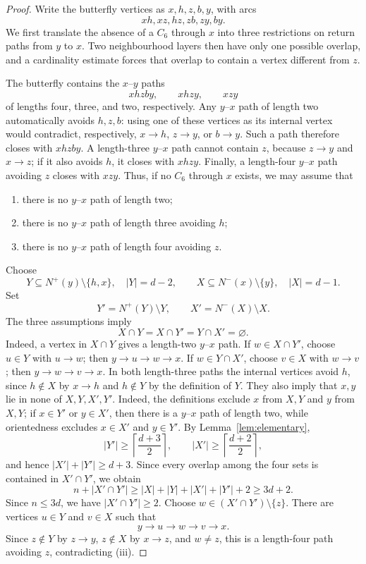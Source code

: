\documentclass[11pt]{amsart}
\theoremstyle{definition}
\begin{document}
\begin{proof}
Write the butterfly vertices as $x,h,z,b,y$, with arcs
\[
  xh,xz,hz,zb,zy,by.
\]
We first translate the absence of a $C_6$ through $x$ into three
restrictions on return paths from $y$ to $x$.  Two neighbourhood layers
then have only one possible overlap, and a cardinality estimate forces
that overlap to contain a vertex different from $z$.

The butterfly contains the $x$--$y$ paths
\[
  xhzby,\qquad xhzy,\qquad xzy
\]
of lengths four, three, and two, respectively.  Any $y$--$x$ path of
length two automatically avoids $h,z,b$: using one of these vertices as
its internal vertex would contradict, respectively, $x\to h$, $z\to y$,
or $b\to y$.  Such a path therefore closes with $xhzby$.  A length-three
$y$--$x$ path cannot contain $z$, because $z\to y$ and $x\to z$; if it
also avoids $h$, it closes with $xhzy$.  Finally, a length-four
$y$--$x$ path avoiding $z$ closes with $xzy$.  Thus, if no $C_6$
through $x$ exists, we may assume that
\begin{enumerate}
\item there is no $y$--$x$ path of length two;
\item there is no $y$--$x$ path of length three avoiding $h$;
\item there is no $y$--$x$ path of length four avoiding $z$.
\end{enumerate}

Choose
\[
  Y\subseteq N^+(y)\setminus\{h,x\},\quad |Y|=d-2,
  \qquad
  X\subseteq N^-(x)\setminus\{y\},\quad |X|=d-1.
\]
Set
\[
  Y'=N^+(Y)\setminus Y,\qquad X'=N^-(X)\setminus X.
\]
The three assumptions imply
\[
  X\cap Y=X\cap Y'=Y\cap X'=\varnothing.
\]
Indeed, a vertex in $X\cap Y$ gives a length-two $y$--$x$ path.  If
$w\in X\cap Y'$, choose $u\in Y$ with $u\to w$; then
$y\to u\to w\to x$.  If $w\in Y\cap X'$, choose $v\in X$ with
$w\to v$; then $y\to w\to v\to x$.  In both length-three paths the
internal vertices avoid $h$, since $h\notin X$ by $x\to h$ and
$h\notin Y$ by the definition of $Y$.
They also imply that $x,y$ lie in none of $X,Y,X',Y'$.  Indeed, the definitions exclude $x$ from $X,Y$ and $y$ from $X,Y$; if $x\in Y'$ or $y\in X'$, then there is a $y$--$x$ path of length two, while orientedness excludes $x\in X'$ and $y\in Y'$.  By Lemma~\ref{lem:elementary},
\[
  |Y'|\ge\left\lceil\frac{d+3}{2}\right\rceil,
  \qquad
  |X'|\ge\left\lceil\frac{d+2}{2}\right\rceil,
\]
and hence $|X'|+|Y'|\ge d+3$.  Since every overlap among the four sets is contained in $X'\cap Y'$, we obtain
\[
  n+|X'\cap Y'|
  \ge |X|+|Y|+|X'|+|Y'|+2
  \ge3d+2.
\]
Since $n\le3d$, we have $|X'\cap Y'|\ge2$.  Choose
$w\in(X'\cap Y')\setminus\{z\}$.  There are vertices $u\in Y$ and
$v\in X$ such that
\[
  y\to u\to w\to v\to x.
\]
Since $z\notin Y$ by $z\to y$, $z\notin X$ by $x\to z$, and
$w\ne z$, this is a length-four path avoiding $z$, contradicting (iii).
\end{proof}
\end{document}
